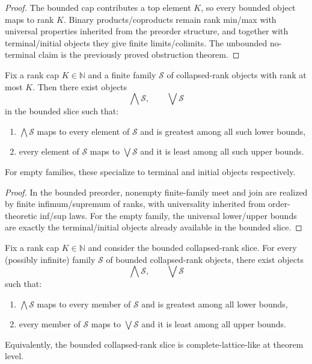 \begin{proof}
The bounded cap contributes a top element $K$, so every bounded object maps to rank $K$. Binary products/coproducts remain rank min/max with universal properties inherited from the preorder structure, and together with terminal/initial objects they give finite limits/colimits. The unbounded no-terminal claim is the previously proved obstruction theorem.
\end{proof}

\begin{theorem}\label{thm:bounded-collapsed-rank-finite-family-lattice}
Fix a rank cap $K\in\mathbb{N}$ and a finite family $\mathcal{S}$ of collapsed-rank objects with rank at most $K$. Then there exist objects
\[
\bigwedge \mathcal{S},\qquad \bigvee \mathcal{S}
\]
in the bounded slice such that:
\begin{enumerate}
\item $\bigwedge \mathcal{S}$ maps to every element of $\mathcal{S}$ and is greatest among all such lower bounds,
\item every element of $\mathcal{S}$ maps to $\bigvee \mathcal{S}$ and it is least among all such upper bounds.
\end{enumerate}
For empty families, these specialize to terminal and initial objects respectively.
\end{theorem}

\begin{proof}
In the bounded preorder, nonempty finite-family meet and join are realized by finite infimum/supremum of ranks, with universality inherited from order-theoretic inf/sup laws. For the empty family, the universal lower/upper bounds are exactly the terminal/initial objects already available in the bounded slice.
\end{proof}

\begin{theorem}\label{thm:bounded-collapsed-rank-complete-lattice}
Fix a rank cap $K\in\mathbb{N}$ and consider the bounded collapsed-rank slice. For every (possibly infinite) family $\mathcal{S}$ of bounded collapsed-rank objects, there exist objects
\[
\bigwedge \mathcal{S},\qquad \bigvee \mathcal{S}
\]
such that:
\begin{enumerate}
\item $\bigwedge \mathcal{S}$ maps to every member of $\mathcal{S}$ and is greatest among all lower bounds,
\item every member of $\mathcal{S}$ maps to $\bigvee \mathcal{S}$ and it is least among all upper bounds.
\end{enumerate}
Equivalently, the bounded collapsed-rank slice is complete-lattice-like at theorem level.
\end{theorem}

